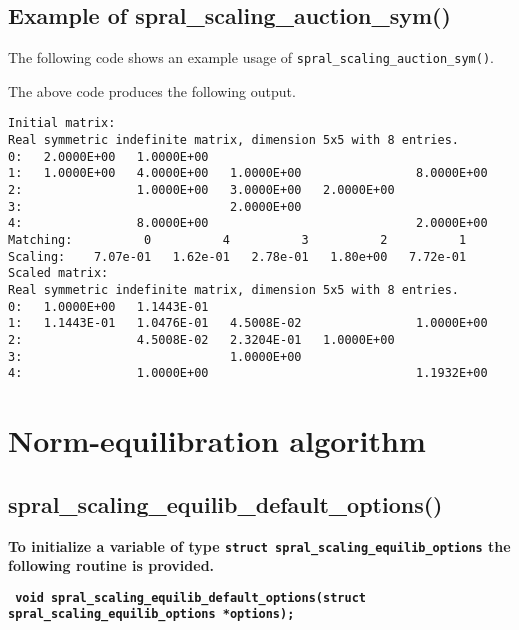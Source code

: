 \subsection{Example of spral\_scaling\_auction\_sym()}
The following code shows an example usage of \texttt{spral\_scaling\_auction\_sym()}.

The above code produces the following output.
\begin{verbatim}
Initial matrix:
Real symmetric indefinite matrix, dimension 5x5 with 8 entries.
0:   2.0000E+00   1.0000E+00                                       
1:   1.0000E+00   4.0000E+00   1.0000E+00                8.0000E+00
2:                1.0000E+00   3.0000E+00   2.0000E+00             
3:                             2.0000E+00                          
4:                8.0000E+00                             2.0000E+00
Matching:          0          4          3          2          1
Scaling:    7.07e-01   1.62e-01   2.78e-01   1.80e+00   7.72e-01
Scaled matrix:
Real symmetric indefinite matrix, dimension 5x5 with 8 entries.
0:   1.0000E+00   1.1443E-01                                       
1:   1.1443E-01   1.0476E-01   4.5008E-02                1.0000E+00
2:                4.5008E-02   2.3204E-01   1.0000E+00             
3:                             1.0000E+00                          
4:                1.0000E+00                             1.1932E+00
\end{verbatim}


\section{Norm-equilibration algorithm}

\subsection{spral\_scaling\_equilib\_default\_options()}

\textbf{To initialize a variable of type
   \texttt{struct spral\_scaling\_equilib\_options} the following routine
   is provided.}

\vspace*{0.3cm}
\noindent
\textbf{\texttt{
   \hspace*{0.3cm} void spral\_scaling\_equilib\_default\_options(struct spral\_scaling\_equilib\_options *options);
}}
\vspace*{-0.4cm}

